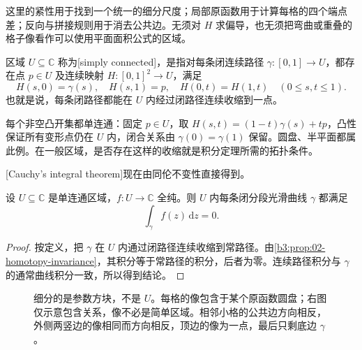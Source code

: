 这里的紧性用于找到一个统一的细分尺度；局部原函数用于计算每格的四个端点差；反向与拼接规则用于消去公共边。无须对 \(H\) 求偏导，也无须把弯曲或重叠的格子像看作可以使用平面面积公式的区域。

\begin{definition}\label{b3:def:02-simply-connected}
区域 \(U\subseteq\mathbb C\) 称为[simply connected]，是指对每条闭连续路径 \(\gamma:[0,1]\to U\)，都存在点 \(p\in U\) 及连续映射 \(H:[0,1]^2\to U\)，满足
\[
 H(s,0)=\gamma(s),
 \quad H(s,1)=p,
 \quad H(0,t)=H(1,t)
 \quad(0\le s,t\le1).
\]
也就是说，每条闭路径都能在 \(U\) 内经过闭路径连续收缩到一点。
\end{definition}

每个非空凸开集都单连通：固定 \(p\in U\)，取
\(H(s,t)=(1-t)\gamma(s)+tp\)，凸性保证所有变形点仍在 \(U\) 内，闭合关系由 \(\gamma(0)=\gamma(1)\) 保留。圆盘、半平面都属此例。在一般区域，是否存在这样的收缩就是积分定理所需的拓扑条件。

\ProseParagraphBreak

[Cauchy's integral theorem]现在由同伦不变性直接得到。

\begin{theorem}\label{b3:thm:02-cauchy-simply-connected}
设 \(U\subseteq\mathbb C\) 是单连通区域，\(f:U\to\mathbb C\) 全纯。则 \(U\) 内每条闭分段光滑曲线 \(\gamma\) 都满足
\[
 \int_\gamma f(z)\,\mathrm{d}z=0.
\]
\end{theorem}
\begin{proof}
按定义，把 \(\gamma\) 在 \(U\) 内通过闭路径连续收缩到常路径。由\cref{b3:prop:02-homotopy-invariance}，其积分等于常路径的积分，后者为零。连续路径积分与 \(\gamma\) 的通常曲线积分一致，所以得到结论。
\end{proof}

\begin{figure}[htbp]
\centering
{}
\caption[同伦方格中的边界相消]{细分的是参数方块，不是 \(U\)。每格的像包含于某个原函数圆盘；右图仅示意包含关系，像不必是简单区域。相邻小格的公共边方向相反，外侧两竖边的像相同而方向相反，顶边的像为一点，最后只剩底边 \(\gamma\)。}
\label{b3:fig:02-homotopy-grid}
\end{figure}

